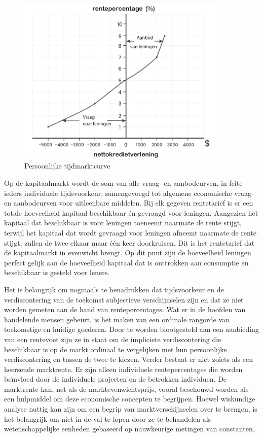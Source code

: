\begin{figure}
\centering
    \includegraphics[width=0.9\textwidth]{figures/fig29-1.png}
    \caption[Persoonlijke tijdmarktcurve]{Persoonlijke tijdmarktcurve}
    \label{fig29}
\end{figure}

Op de kapitaalmarkt wordt de som van alle vraag- en aanbodcurven, in feite ieders individuele tijdsvoorkeur, samengevoegd tot algemene economische vraag- en aanbodcurven voor uitleenbare middelen. Bij elk gegeven rentetarief is er een totale hoeveelheid kapitaal beschikbaar én gevraagd voor leningen. Aangezien het kapitaal dat beschikbaar is voor leningen toeneemt naarmate de rente stijgt, terwijl het kapitaal dat wordt gevraagd voor leningen afneemt naarmate de rente stijgt, zullen de twee elkaar maar één keer doorkruisen. Dit is het rentetarief dat de kapitaalmarkt in evenwicht brengt. Op dit punt zijn de hoeveelheid leningen perfect gelijk aan de hoeveelheid kapitaal dat is onttrokken aan consumptie en beschikbaar is gesteld voor leners.

Het is belangrijk om nogmaals te benadrukken dat tijdsvoorkeur en de verdiscontering van de toekomst subjectieve verschijnselen zijn en dat ze niet worden gemeten aan de hand van rentepercentages. Wat er in de hoofden van handelende mensen gebeurt, is het maken van een ordinale rangorde van toekomstige en huidige goederen. Door te worden blootgesteld aan een aanbieding van een rentevoet zijn ze in staat om de impliciete verdiscontering die beschikbaar is op de markt ordinaal te vergelijken met hun persoonlijke verdiscontering en tussen de twee te kiezen. Verder bestaat er niet zoiets als een heersende marktrente. Er zijn alleen individuele rentepercentages die worden beïnvloed door de individuele projecten en de betrokken individuen. De marktrente kan, net als de marktevenwichtsprijs, vooral beschouwd worden als een hulpmiddel om deze economische concepten te begrijpen. Hoewel wiskundige analyse nuttig kan zijn om een begrip van marktverschijnselen over te brengen, is het belangrijk om niet in de val te lopen door ze te behandelen als wetenschappelijke eenheden gebaseerd op nauwkeurige metingen van constanten.

